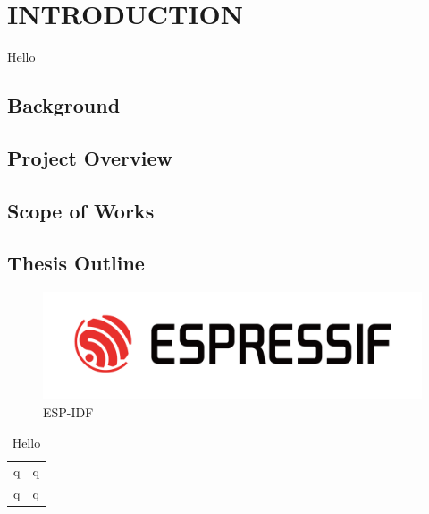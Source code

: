 \section{INTRODUCTION}
Hello \cite{haras2018thermoelectricity}
\subsection{Background}
\subsection{Project Overview}
\subsection{Scope of Works}
\subsection{Thesis Outline}
\begin{figure}[H]
    \centering
    \includegraphics[width=0.5\linewidth]{figure/image.png}
    \caption{ESP-IDF}
    \label{fig:enter-label}
\end{figure}
\begin{table}[H]
    \centering
    \caption{Hello}
    \begin{tabular}{c|c}
        q & q \\
      q   & q
    \end{tabular}
    \label{tab:my_label}
\end{table}